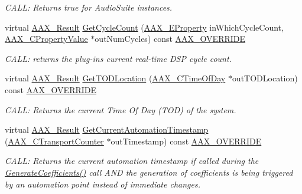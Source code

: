\begin{DoxyCompactItemize}
\begin{DoxyCompactList}\small\item\em C\+A\+L\+L\+: Returns true for Audio\+Suite instances. \end{DoxyCompactList}\item 
virtual \hyperlink{a00149_a4d8f69a697df7f70c3a8e9b8ee130d2f}{A\+A\+X\+\_\+\+Result} \hyperlink{a00132_ae3f6c0fe04bc0d8c0d6ea81f1795d1f7}{Get\+Cycle\+Count} (\hyperlink{a00283_a6571f4e41a5dd06e4067249228e2249e}{A\+A\+X\+\_\+\+E\+Property} in\+Which\+Cycle\+Count, \hyperlink{a00149_ab247c0d8686c14e05cbb567ef276f249}{A\+A\+X\+\_\+\+C\+Property\+Value} $\ast$out\+Num\+Cycles) const \hyperlink{a00149_ac2f24a5172689ae684344abdcce55463}{A\+A\+X\+\_\+\+O\+V\+E\+R\+R\+I\+D\+E}
\begin{DoxyCompactList}\small\item\em C\+A\+L\+L\+: returns the plug-\/in\textquotesingle{}s current real-\/time D\+S\+P cycle count. \end{DoxyCompactList}\item 
virtual \hyperlink{a00149_a4d8f69a697df7f70c3a8e9b8ee130d2f}{A\+A\+X\+\_\+\+Result} \hyperlink{a00132_a49d0b1bc7b05f7b51b71f2a8c6bc2d42}{Get\+T\+O\+D\+Location} (\hyperlink{a00149_a46542a1dcccdcc3b4260a9926edf8a2a}{A\+A\+X\+\_\+\+C\+Time\+Of\+Day} $\ast$out\+T\+O\+D\+Location) const \hyperlink{a00149_ac2f24a5172689ae684344abdcce55463}{A\+A\+X\+\_\+\+O\+V\+E\+R\+R\+I\+D\+E}
\begin{DoxyCompactList}\small\item\em C\+A\+L\+L\+: Returns the current Time Of Day (T\+O\+D) of the system. \end{DoxyCompactList}\item 
virtual \hyperlink{a00149_a4d8f69a697df7f70c3a8e9b8ee130d2f}{A\+A\+X\+\_\+\+Result} \hyperlink{a00132_a0dcc17461e18231f56c4910896abdb79}{Get\+Current\+Automation\+Timestamp} (\hyperlink{a00149_ac09cd6857748cc296ac0f8bcc20dc74b}{A\+A\+X\+\_\+\+C\+Transport\+Counter} $\ast$out\+Timestamp) const \hyperlink{a00149_ac2f24a5172689ae684344abdcce55463}{A\+A\+X\+\_\+\+O\+V\+E\+R\+R\+I\+D\+E}
\begin{DoxyCompactList}\small\item\em C\+A\+L\+L\+: Returns the current automation timestamp if called during the \hyperlink{a00061_a083265b008921b6114ede387711694b7}{Generate\+Coefficients()} call A\+N\+D the generation of coefficients is being triggered by an automation point instead of immediate changes. \end{DoxyCompactList}\item 

\end{DoxyCompactItemize}
